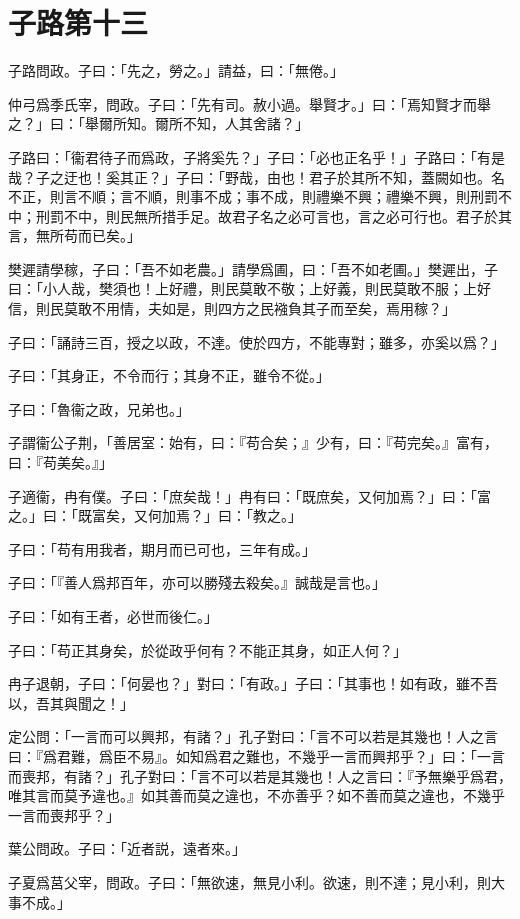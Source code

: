 \section[子路第十三]{子路第十三}

子路問政。子曰：「先之，勞之。」請益，曰：「無倦。」

仲弓爲季氏宰，問政。子曰：「先有司。赦小過。舉賢才。」曰：「焉知賢才而舉之？」曰：「舉爾所知。爾所不知，人其舍諸？」

子路曰：「衞君待子而爲政，子將奚先？」子曰：「必也正名乎！」子路曰：「有是哉？子之迂也！奚其正？」子曰：「野哉，由也！君子於其所不知，蓋闕如也。名不正，則言不順；言不順，則事不成；事不成，則禮樂不興；禮樂不興，則刑罰不中；刑罰不中，則民無所措手足。故君子名之必可言也，言之必可行也。君子於其言，無所苟而已矣。」

樊遲請學稼，子曰：「吾不如老農。」請學爲圃，曰：「吾不如老圃。」樊遲出，子曰：「小人哉，樊須也！上好禮，則民莫敢不敬；上好義，則民莫敢不服；上好信，則民莫敢不用情，夫如是，則四方之民襁負其子而至矣，焉用稼？」

子曰：「誦詩三百，授之以政，不達。使於四方，不能專對；雖多，亦奚以爲？」

子曰：「其身正，不令而行；其身不正，雖令不從。」

子曰：「魯衞之政，兄弟也。」

子謂衞公子荆，「善居室：始有，曰：『苟合矣；』少有，曰：『苟完矣。』富有，曰：『苟美矣。』」

子適衞，冉有僕。子曰：「庶矣哉！」冉有曰：「既庶矣，又何加焉？」曰：「富之。」曰：「既富矣，又何加焉？」曰：「教之。」

子曰：「苟有用我者，期月而已可也，三年有成。」

子曰：「『善人爲邦百年，亦可以勝殘去殺矣。』誠哉是言也。」

子曰：「如有王者，必世而後仁。」

子曰：「苟正其身矣，於從政乎何有？不能正其身，如正人何？」

冉子退朝，子曰：「何晏也？」對曰：「有政。」子曰：「其事也！如有政，雖不吾以，吾其與聞之！」

定公問：「一言而可以興邦，有諸？」孔子對曰：「言不可以若是其幾也！人之言曰：『爲君難，爲臣不易』。如知爲君之難也，不幾乎一言而興邦乎？」曰：「一言而喪邦，有諸？」孔子對曰：「言不可以若是其幾也！人之言曰：『予無樂乎爲君，唯其言而莫予違也。』如其善而莫之違也，不亦善乎？如不善而莫之違也，不幾乎一言而喪邦乎？」

葉公問政。子曰：「近者説，遠者來。」

子夏爲莒父宰，問政。子曰：「無欲速，無見小利。欲速，則不達；見小利，則大事不成。」

